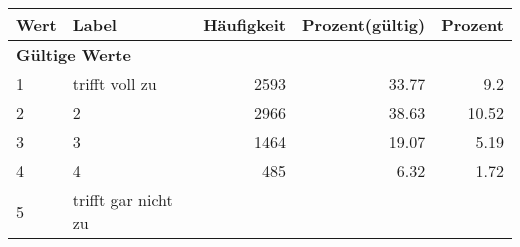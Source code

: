      \begin{longtable}{lXrrr}
     \toprule
     \textbf{Wert} & \textbf{Label} & \textbf{Häufigkeit} & \textbf{Prozent(gültig)} & \textbf{Prozent} \\
     \endhead
     \midrule
     \multicolumn{5}{l}{\textbf{Gültige Werte}}\\

     1 &
     \multicolumn{1}{X}{ trifft voll zu   } &


       \num{2593} &
       \num[round-mode=places,round-precision=2]{33.77} &
         \num[round-mode=places,round-precision=2]{9.2} \\

     2 &
     \multicolumn{1}{X}{ 2   } &


       \num{2966} &
       \num[round-mode=places,round-precision=2]{38.63} &
         \num[round-mode=places,round-precision=2]{10.52} \\

     3 &
     \multicolumn{1}{X}{ 3   } &


       \num{1464} &
       \num[round-mode=places,round-precision=2]{19.07} &
         \num[round-mode=places,round-precision=2]{5.19} \\

     4 &
     \multicolumn{1}{X}{ 4   } &


       \num{485} &
       \num[round-mode=places,round-precision=2]{6.32} &
         \num[round-mode=places,round-precision=2]{1.72} \\

     5 &
     \multicolumn{1}{X}{ trifft gar nicht zu   } &



\end{longtable}
